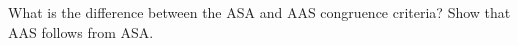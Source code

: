 What is the difference between the ASA and AAS congruence criteria? Show that AAS follows from ASA.

